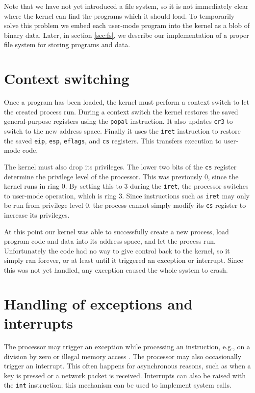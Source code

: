 \documentclass{report}
\begin{document}
Note that we have not yet introduced a file system, so it is not immediately
clear where the kernel can find the programs which it should load. To
temporarily solve this problem we embed each user-mode program into the kernel
as a blob of binary data. Later, in section \ref{sec:fs}, we describe our
implementation of a proper file system for storing programs and data.

\section{Context switching}
Once a program has been loaded, the kernel must perform a context switch to
let the created process run. During a context switch the kernel restores the
saved general-purpose registers using the \texttt{popal} instruction. It also
updates \texttt{cr3} to switch to the new address space. Finally it uses the
\texttt{iret} instruction to restore the saved \texttt{eip}, \texttt{esp},
\texttt{eflags}, and \texttt{cs} registers. This transfers execution to
user-mode code. 

The kernel must also drop its privileges. The lower two bits of the
\texttt{cs} register determine the privilege level of the processor. This was
previously 0, since the kernel runs in ring 0. By setting this to 3 during the
\texttt{iret}, the processor switches to user-mode operation, which is ring 3.
Since instructions such as \texttt{iret} may only be run from privilege level
0, the process cannot simply modify its \texttt{cs} register to increase its
privileges.

At this point our kernel was able to successfully create a new process, load
program code and data into its address space, and let the process run.
Unfortunately the code had no way to give control back to the kernel, so it
simply ran forever, or at least until it triggered an exception or interrupt.
Since this was not yet handled, any exception caused the whole system to
crash.


\section{Handling of exceptions and interrupts}
The processor may trigger an exception while processing an instruction, e.g.,
on a division by zero or illegal memory access \cite{manual8086ch9, exceptions}.
The processor may also occasionally trigger an interrupt. This often happens
for asynchronous reasons, such as when a key is pressed or a network packet is
received. Interrupts can also be raised with the \texttt{int} instruction;
this mechanism can be used to implement system calls.
\end{document}
